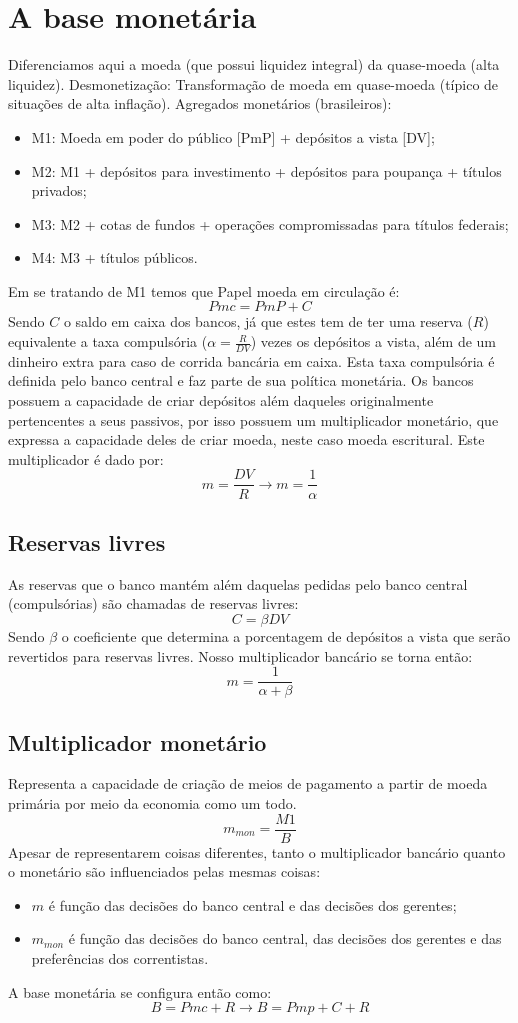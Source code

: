 \documentclass[12pt,a4paper,oneside,brazil]{abntex2}
\begin{document}
\section{A base monetária}
Diferenciamos aqui a moeda (que possui liquidez integral) da quase-moeda (alta liquidez). \newline
Desmonetização: Transformação de moeda em quase-moeda (típico de situações de alta inflação). \newline
Agregados monetários (brasileiros):
\begin{itemize}
\item M1: Moeda em poder do público [PmP] + depósitos a vista [DV];
\item M2: M1 + depósitos para investimento + depósitos para poupança + títulos privados;
\item M3: M2 + cotas de fundos + operações compromissadas para títulos federais;
\item M4: M3 + títulos públicos.
\end{itemize}
Em se tratando de M1 temos que Papel moeda em circulação é:
\[ Pmc = PmP + C\]
Sendo $C$ o saldo em caixa dos bancos, já que estes tem de ter uma reserva ($R$) equivalente a taxa compulsória ($\alpha = \frac{R}{DV}$) vezes os depósitos a vista, além de um dinheiro extra  para caso de corrida bancária em caixa. Esta taxa compulsória é definida pelo banco central e faz parte de sua política monetária. Os bancos possuem a capacidade de criar depósitos além daqueles originalmente pertencentes a seus passivos, por isso possuem um multiplicador monetário, que expressa a capacidade deles de criar moeda, neste caso moeda escritural. Este multiplicador é dado por:
\[  m = \frac{DV}{R} \rightarrow m = \frac{1}{\alpha} \]

\subsection{Reservas livres}
As reservas que o banco mantém além daquelas pedidas pelo banco central (compulsórias) são chamadas de reservas livres:
\[ C = \beta DV \]
Sendo $\beta$ o coeficiente que determina a porcentagem de depósitos a vista que serão revertidos para reservas livres. Nosso multiplicador bancário se torna então:
\[  m = \frac{1}{\alpha + \beta} \]

\subsection{Multiplicador monetário}
Representa a capacidade de criação de meios de pagamento a partir de moeda primária por meio da economia como um todo.
\[ m_{mon} = \frac{M1}{B} \]
Apesar de representarem coisas diferentes, tanto o multiplicador bancário quanto o monetário são influenciados pelas mesmas coisas:
\begin{itemize}
\item $m$ é função das decisões do banco central e das decisões dos gerentes;
\item $m_{mon}$ é função das decisões do banco central, das decisões dos gerentes e das preferências dos correntistas.
\end{itemize}
A base monetária se configura então como:
\[ B = Pmc + R \rightarrow B = Pmp + C + R \]
\end{document}
